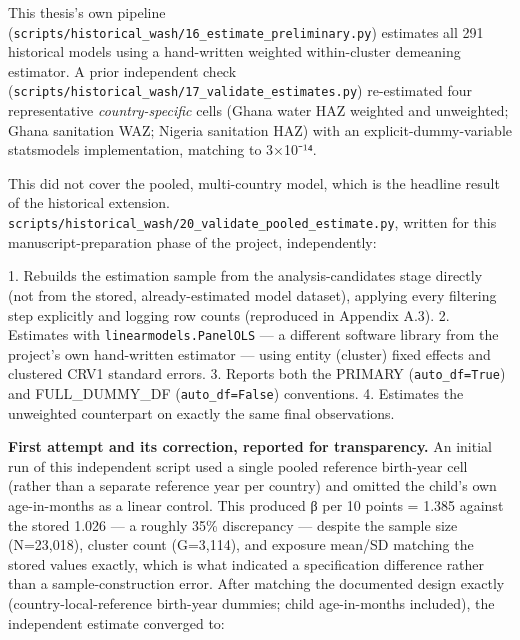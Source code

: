 This thesis's own pipeline (\texttt{scripts/\allowbreak{}historical\_\allowbreak{}wash/\allowbreak{}16\_\allowbreak{}estimate\_\allowbreak{}preliminary.\allowbreak{}py}) estimates all 291 historical models using a hand-written weighted within-cluster demeaning estimator. A prior independent check (\texttt{scripts/\allowbreak{}historical\_\allowbreak{}wash/\allowbreak{}17\_\allowbreak{}validate\_\allowbreak{}estimates.\allowbreak{}py}) re-estimated four representative \textit{country-specific} cells (Ghana water HAZ weighted and unweighted; Ghana sanitation WAZ; Nigeria sanitation HAZ) with an explicit-dummy-variable statsmodels implementation, matching to 3×10⁻¹⁴.

This did not cover the pooled, multi-country model, which is the headline result of the historical extension. \texttt{scripts/\allowbreak{}historical\_\allowbreak{}wash/\allowbreak{}20\_\allowbreak{}validate\_\allowbreak{}pooled\_\allowbreak{}estimate.\allowbreak{}py}, written for this manuscript-preparation phase of the project, independently:

1. Rebuilds the estimation sample from the analysis-candidates stage directly (not from the stored, already-estimated model dataset), applying every filtering step explicitly and logging row counts (reproduced in Appendix A.3).
2. Estimates with \texttt{linearmodels.\allowbreak{}PanelOLS} --- a different software library from the project's own hand-written estimator --- using entity (cluster) fixed effects and clustered CRV1 standard errors.
3. Reports both the PRIMARY (\texttt{auto\_\allowbreak{}df=True}) and FULL\_DUMMY\_DF (\texttt{auto\_\allowbreak{}df=False}) conventions.
4. Estimates the unweighted counterpart on exactly the same final observations.

\textbf{First attempt and its correction, reported for transparency.} An initial run of this independent script used a single pooled reference birth-year cell (rather than a separate reference year per country) and omitted the child's own age-in-months as a linear control. This produced β per 10 points = 1.385 against the stored 1.026 --- a roughly 35\% discrepancy --- despite the sample size (N=23,018), cluster count (G=3,114), and exposure mean/SD matching the stored values exactly, which is what indicated a specification difference rather than a sample-construction error. After matching the documented design exactly (country-local-reference birth-year dummies; child age-in-months included), the independent estimate converged to:

